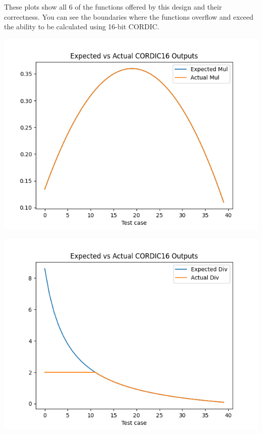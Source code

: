 \documentclass{article}
\begin{document}
\noindent These plots show all 6 of the functions offered by this design and their
correctness. You can see the boundaries where the functions overflow and
exceed the ability to be calculated using 16-bit CORDIC.

    \begin{center}

        \includegraphics[scale=.7]{cordic16_mul.png}

        \includegraphics[scale=.7]{cordic16_div.png}


\end{center}
\end{document}
